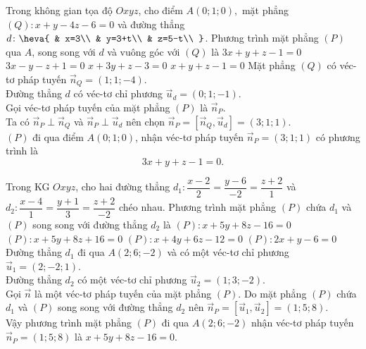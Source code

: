 \begin{ex}%
Trong không gian tọa độ $ Oxyz$, cho điểm $ A(0;1;0),$ mặt phẳng \break $(Q)\colon x+y-4z-6=0$ và đường thẳng $ d\colon\heva{
& x=3\\ 
& y=3+t\\ 
& z=5-t\\ 
}$. Phương trình mặt phẳng $(P)$ qua $ A$, song song với $ d$ và vuông góc với $(Q)$ là 
\choice
{\True $ 3x+y+z-1=0$}
{$ 3x-y-z+1=0$}
{$ x+3y+z-3=0$}
{$ x+y+z-1=0$}
\loigiai
{
Mặt phẳng $(Q)$ có véc-tơ pháp tuyến $\overrightarrow{n}_Q=(1;1;-4)$.\\
Đường thẳng $ d$ có véc-tơ chỉ phương $\overrightarrow{u}_d=(0;1;-1)$.\\
Gọi véc-tơ pháp tuyến của mặt phẳng $(P)$ là $\overrightarrow{n}_P$.\\
Ta có $\overrightarrow{n}_P\perp\overrightarrow{n}_Q$ và $\overrightarrow{n}_P\perp\overrightarrow{u}_d$ nên chọn $\overrightarrow{n}_P=\left[\overrightarrow{n}_Q,\overrightarrow{u}_d\right]=(3;1;1)$.\\
$(P)$ đi qua điểm $ A(0;1;0)$, nhận véc-tơ pháp tuyến $\overrightarrow{n}_P=(3;1;1)$ có phương trình là $$ 3x+y+z-1=0.$$}
\end{ex}

\begin{ex}%
Trong KG $Oxyz$, cho hai đường thẳng $d_1\colon\dfrac{x-2}{2}=\dfrac{y-6}{-2}=\dfrac{z+2}{1}$ và $d_2\colon\dfrac{x-4}{1}=\dfrac{y+1}{3}=\dfrac{z+2}{-2}$ chéo nhau. Phương trình mặt phẳng $(P)$ chứa $d_1$ và $(P)$ song song với đường thẳng $d_2$ là
\choice
{\True $(P)\colon x+5y+8z-16=0$}
{$(P)\colon x+5y+8z+16=0$}
{$(P)\colon x+4y+6z-12=0$}
{$(P)\colon 2x+y-6=0$}
\loigiai
{
Đường thẳng $d_1$ đi qua $ A\left(2;6;-2\right)$ và có một véc-tơ chỉ phương $\overrightarrow{u}_1=\left(2;-2;1\right)$.\\
Đường thẳng $d_2$ có một véc-tơ chỉ phương $\overrightarrow{u}_2=(1;3;-2)$.\\
Gọi $\overrightarrow{n}$ là một véc-tơ pháp tuyến của mặt phẳng $(P)$. Do mặt phẳng $(P)$ chứa $d_1$ và $(P)$ song song với đường thẳng $d_2$ nên $\overrightarrow{n}_P=\left[\overrightarrow{u}_1,\overrightarrow{u}_2\right]=(1;5;8)$.\\
Vậy phương trình mặt phẳng $(P)$ đi qua $ A(2;6;-2)$ nhận véc-tơ pháp tuyến $\overrightarrow{n}_P=(1;5;8)$ là $ x+5y+8z-16=0$.}
\end{ex}

